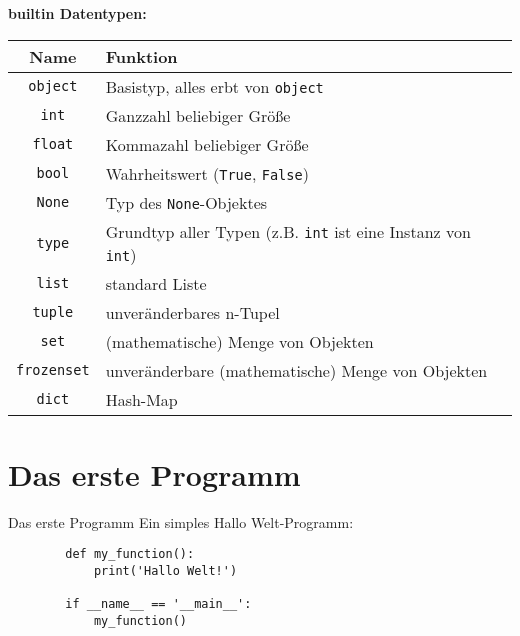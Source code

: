 \begin{frame}[fragile]
	\textbf{builtin Datentypen:}\\
	\begin{tabular}{c|l}
		Name & Funktion \\ \hline
		\texttt{object} & Basistyp, alles erbt von \texttt{object} \\
		\texttt{int} & Ganzzahl \glqq{}beliebiger\grqq{} Grö\ss{}e \\
		\texttt{float} & Kommazahl \glqq{}beliebiger\grqq{} Grö\ss{}e \\
		\texttt{bool} & Wahrheitswert (\texttt{True}, \texttt{False})\\
		\texttt{None} & Typ des \texttt{None}-Objektes \\
		\texttt{type} & Grundtyp aller Typen (z.B. \texttt{int} ist eine Instanz von \texttt{int}) \\
		\texttt{list} & standard Liste \\
		\texttt{tuple} & unveränderbares n-Tupel \\
		\texttt{set} & (mathematische) Menge von Objekten \\
		\texttt{frozenset} & unveränderbare (mathematische) Menge von Objekten \\
		\texttt{dict} & Hash-Map \\
	\end{tabular}
\end{frame}


\section{Das erste Programm}
\begin{frame}[fragile]{Das erste Programm}
	Ein simples \glqq{}Hallo Welt\grqq{}-Programm:\\[.5cm]
	\begin{lstlisting}
		def my_function():
		    print('Hallo Welt!')
		
		if __name__ == '__main__':
		    my_function()
	\end{lstlisting}
\end{frame}


